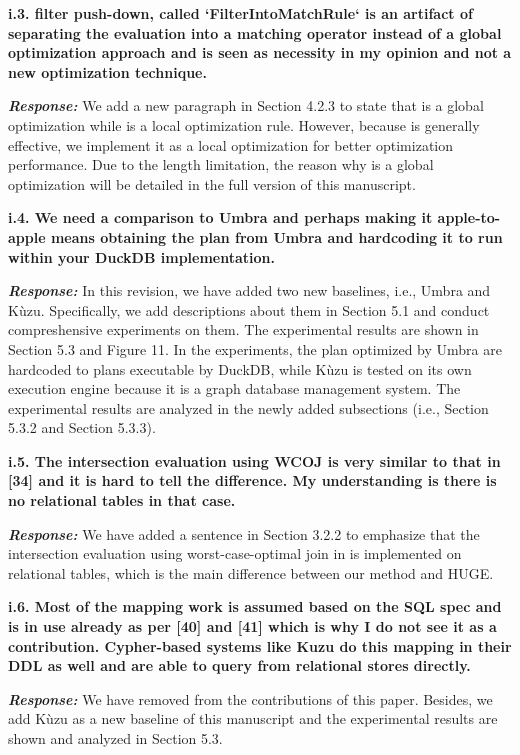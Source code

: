 \textbf{i.3. filter push-down, called `FilterIntoMatchRule` is an artifact of separating the evaluation into a matching operator instead of a global optimization approach and is seen as necessity in my opinion and not a new optimization technique.}

\textbf{\textit{Response: }} We add a new paragraph in Section 4.2.3 to state that \filterrule is a global optimization while \fusionrule is a local optimization rule.
However, because \filterrule is generally effective, we implement it as a local optimization for better optimization performance.
Due to the length limitation, the reason why \filterrule is a global optimization will be detailed in the full version of this manuscript.


\textbf{
i.4. We need a comparison to Umbra and perhaps making it apple-to-apple means obtaining the plan from Umbra and hardcoding it to run within your DuckDB implementation.
}

\textbf{\textit{Response: }} In this revision, we have added two new baselines, i.e., Umbra and K\`uzu.
Specifically, we add descriptions about them in Section 5.1 and conduct compreshensive experiments on them.
The experimental results are shown in Section 5.3 and Figure 11.
In the experiments, the plan optimized by Umbra are hardcoded to plans executable by DuckDB, while K\`uzu is tested on its own execution engine because it is a graph database management system.
The experimental results are analyzed in the newly added subsections (i.e., Section 5.3.2 and Section 5.3.3).


\textbf{
i.5. The intersection evaluation using WCOJ is very similar to that in [34] and it is hard to tell the difference. My understanding is there is no relational tables in that case.}

\textbf{\textit{Response: }}
We have added a sentence in Section 3.2.2 to emphasize that the intersection evaluation using worst-case-optimal join in \name is implemented on relational tables, which is the main difference between our method and HUGE.


\textbf{
i.6. Most of the mapping work is assumed based on the SQL spec and is in use already as per [40] and [41] which is why I do not see it as a contribution. Cypher-based systems like Kuzu do this mapping in their DDL as well and are able to query from relational stores directly.}

\textbf{\textit{Response: }}
We have removed \rgmapping from the contributions of this paper.
Besides, we add K\`uzu as a new baseline of this manuscript and the experimental results are shown and analyzed in Section 5.3.


